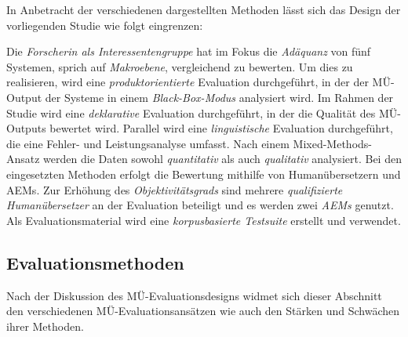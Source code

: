 In Anbetracht der verschiedenen dargestellten Methoden lässt sich das Design der vorliegenden Studie wie folgt eingrenzen:

Die \textit{Forscherin als Interessentengruppe} hat im Fokus die \textit{Adäquanz} von fünf Systemen, sprich auf \textit{Makroebene}, vergleichend zu bewerten. Um dies zu realisieren, wird eine \textit{produktorientierte} Evaluation durchgeführt, in der der MÜ-Output der Systeme in einem \textit{Black-Box-Modus} analysiert wird. Im Rahmen der Studie wird eine \textit{deklarative} Evaluation durchgeführt, in der die Qualität des MÜ-Outputs bewertet wird. Parallel wird eine \textit{linguistische} Evaluation durchgeführt, die eine Fehler- und Leistungsanalyse umfasst. Nach einem Mixed-Methods-Ansatz werden die Daten sowohl \textit{quantitativ} als auch \textit{qualitativ} analysiert. Bei den eingesetzten Methoden erfolgt die Bewertung mithilfe von Humanübersetzern und AEMs. Zur Erhöhung des \textit{Objektivitätsgrads} sind mehrere \textit{qualifizierte Humanübersetzer} an der Evaluation beteiligt und es werden zwei \textit{AEMs} genutzt. Als Evaluationsmaterial wird eine \textit{korpusbasierte Testsuite} erstellt und verwendet.

\subsection{Evaluationsmethoden}
\label{sec:3.3.3}
Nach der Diskussion des MÜ-Evaluationsdesigns widmet sich dieser Abschnitt den verschiedenen MÜ-Evaluationsansätzen wie auch den Stärken und Schwächen ihrer Methoden.

